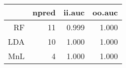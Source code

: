 \begin{table}[ht]
\centering
\begin{tabular}{rrrr}
  \hline
 & npred & ii.auc & oo.auc \\ 
  \hline
RF &   11 & 0.999 & 1.000 \\ 
  LDA &   10 & 1.000 & 1.000 \\ 
  MnL &    4 & 1.000 & 1.000 \\ 
   \hline
\end{tabular}
\label{tab:second_res}
\end{table}
